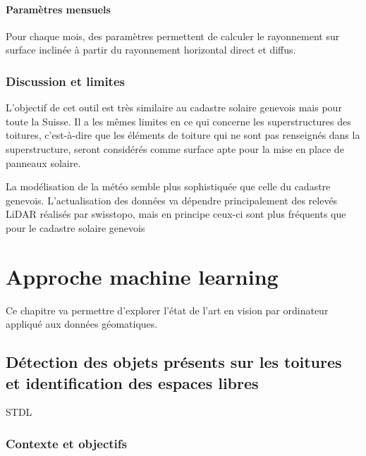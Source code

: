 \paragraph{Paramètres mensuels}
\par{Pour chaque mois, des paramètres permettent de calculer le rayonnement sur surface inclinée à partir du rayonnement horizontal direct et diffus.}
\subsubsection{Discussion et limites}
\par{L'objectif de cet outil est très similaire au cadastre solaire genevois mais pour toute la Suisse. Il a les mêmes limites en ce qui concerne les superstructures des toitures, c'est-à-dire que les éléments de toiture qui ne sont pas renseignés dans la superstructure, seront considérés comme surface apte pour la mise en place de panneaux solaire.}
\par{La modélisation de la météo semble plus sophistiquée que celle du cadastre genevois. L'actualisation des données va dépendre principalement des relevés LiDAR réalisés par swisstopo, mais en principe ceux-ci sont plus fréquents que pour le cadastre solaire genevois}

\section{Approche machine learning}

\par{Ce chapitre va permettre d'explorer l'état de l'art en vision par ordinateur appliqué aux données géomatiques.}

\subsection{Détection des objets présents sur les toitures et identification des espaces libres}

\par{STDL}

\subsubsection{Contexte et objectifs}

